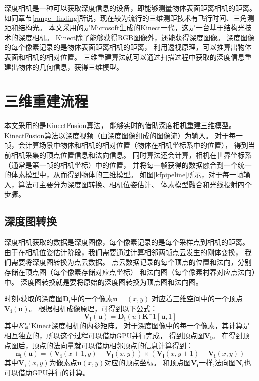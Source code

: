 深度相机是一种可以获取深度信息的设备，即能够测量物体表面距离相机的距离。
如同章节\ref{range_finding}所说，现在较为流行的三维测距技术有飞行时间、三角测距和结构光。
本文采用的是Microsoft生成的Kinect一代，这是一台基于结构光技术的深度相机。
Kinect除了能够获得RGB图像外，还能获得深度图像。
深度图像的每个像素记录的是物体表面距离相机的距离，
利用透视原理，可以推算出物体表面和相机的相对位置。
三维重建算法就可以通过扫描过程中获取的深度信息重建出物体的几何信息，获得三维模型。

\section{三维重建流程}
本文采用的是KinectFusion算法\cite{izadi2011kinectfusion}，
能够实时的借助深度相机重建三维模型。
KinectFusion算法\cite{izadi2011kinectfusion}以深度视频（由深度图像组成的图像流）为输入。
对于每一帧，会计算场景中物体和相机的相对位置（物体在相机坐标系中的位置），
得到当前相机采集的顶点位置信息和法向信息。
同时算法还会计算，相机在世界坐标系（通常是第一帧的相机坐标）中的位置，
并将每一帧获得的数据融合到一个统一的体素模型中，从而得到物体的三维模型。
如图\ref{kfpipeline}所示，对于每一帧输入，算法可主要分为深度图转换、相机位姿估计、
体素模型融合和光线投射四个步骤。

\subsection{深度图转换}
深度相机获取的数据是深度图像，每个像素记录的是每个采样点到相机的距离。
由于在相机位姿估计阶段，我们需要通过计算相邻两帧点云发生的刚体变换，
我们需要将深度图转换为点云数据。
点云数据记录的每个顶点的位置和法向，分别存储在顶点图（每个像素存储对应点坐标）
和法向图（每个像素村春对应点法向）中。
深度图转换就是要将原始的深度图转换为顶点图和法向图。

时刻$i$获取的深度图$\bm{D_i}$中的一个像素$\bm{u}=(x,y)$
对应着三维空间中的一个顶点$\bm{V_i}(\bm{u})$。
根据相机成像原理，可得到以下公式：
\begin{equation}
    \bm{V_i(u)}=\bm{D_i}(u)\bm{K}^-1[\bm{u},1]
\end{equation}
其中$K$是Kinect深度相机的内参矩阵。
对于深度图像中的每一个像素，其计算是相互独立的，所以这个过程可以借助GPU并行完成，
得到顶点图$\bm{V_i}$。
在得到顶点图后，顶点的法向量就可以借助相邻顶点的信息计算得到：
\begin{equation}
    \bm{n_i}(\bm{u})=(\bm{V_i}(x+1,y)-\bm{V_i}(x,y))\times(\bm{V_i}(x,y+1)-\bm{V_i}(x,y))
\end{equation}
其中$\bm{V_i}(x,y)$为像素点$\bm{u}(x,y)$对应的顶点坐标。
和顶点图$\bm{V_i}$一样,法向图$\bm{N_i}$也可以借助GPU并行的计算。

